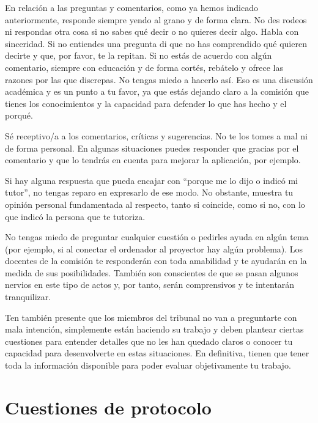 En relación a las preguntas y comentarios, como ya hemos indicado anteriormente, responde siempre yendo al grano y de forma clara. No des rodeos ni respondas otra cosa si no sabes qué decir o no quieres decir algo. Habla con sinceridad. Si no entiendes una pregunta di que no has comprendido qué quieren decirte y que, por favor, te la repitan. Si no estás de acuerdo con algún comentario, siempre con educación y de forma cortés, rebátelo y ofrece las razones por las que discrepas. No tengas miedo a hacerlo así. Eso es una discusión académica y es un punto a tu favor, ya que estás dejando claro a la comisión que tienes los conocimientos y la capacidad para defender lo que has hecho y el porqué.

Sé receptivo/a a los comentarios, críticas y sugerencias. No te los tomes a mal ni de forma personal. En algunas situaciones puedes responder que gracias por el comentario y que lo tendrás en cuenta para mejorar la aplicación, por ejemplo. 


Si hay alguna respuesta que pueda encajar con ``porque me lo dijo o indicó mi tutor'', no tengas reparo en expresarlo de ese modo. No obstante, muestra tu opinión personal fundamentada al respecto, tanto si coincide, como si no, con lo que indicó la persona que te tutoriza. 

No tengas miedo de preguntar cualquier cuestión o pedirles ayuda en algún tema (por ejemplo, si al conectar el ordenador al proyector hay algún problema). Los docentes de la comisión te responderán con toda amabilidad y te ayudarán en la medida de sus posibilidades. También son conscientes de que se pasan algunos nervios en este tipo de actos y, por tanto, serán comprensivos y te intentarán tranquilizar.

Ten también presente que los miembros del tribunal no van a preguntarte con mala intención, simplemente están haciendo su trabajo y deben plantear ciertas cuestiones para entender detalles que no les han quedado claros o conocer tu capacidad para desenvolverte en estas situaciones. En definitiva, tienen que tener toda la información disponible para poder evaluar objetivamente tu trabajo.

\section{Cuestiones de protocolo}

